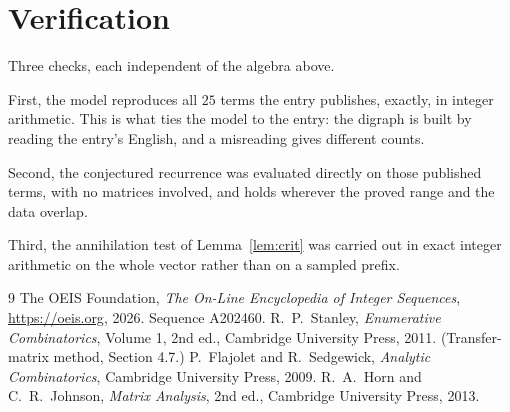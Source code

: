 \documentclass[11pt,a4paper]{article}
\theoremstyle{plain}
\theoremstyle{definition}
\begin{document}
\section{Verification}

Three checks, each independent of the algebra above.

First, the model reproduces all $25$ terms the entry publishes, exactly, in integer
arithmetic. This is what ties the model to the entry: the digraph is built by reading the
entry's English, and a misreading gives different counts.

Second, the conjectured recurrence was evaluated directly on those published terms, with no
matrices involved, and holds wherever the proved range and the data overlap.

Third, the annihilation test of Lemma~\ref{lem:crit} was carried out in exact integer
arithmetic on the whole vector rather than on a sampled prefix.

\begin{thebibliography}{9}
 The OEIS Foundation, \emph{The On-Line Encyclopedia of Integer
Sequences}, \url{https://oeis.org}, 2026. Sequence A202460.
 R.~P.~Stanley, \emph{Enumerative Combinatorics}, Volume 1, 2nd ed.,
Cambridge University Press, 2011. (Transfer-matrix method, Section 4.7.)
 P.~Flajolet and R.~Sedgewick, \emph{Analytic Combinatorics}, Cambridge
University Press, 2009.
 R.~A.~Horn and C.~R.~Johnson, \emph{Matrix Analysis}, 2nd ed., Cambridge
University Press, 2013.
\end{thebibliography}
\end{document}
